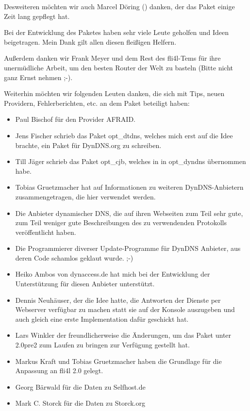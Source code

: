 Desweiteren möchten wir auch Marcel Döring () danken,
der das Paket einige Zeit lang gepflegt hat.

Bei der Entwicklung des Paketes haben sehr viele Leute geholfen und
Ideen beigetragen. Mein Dank gilt allen diesen fleißigen Helfern.

Außerdem danken wir Frank Meyer und dem Rest des fli4l-Tems für ihre
unermüdliche Arbeit, um den besten Router der Welt zu
basteln (Bitte nicht ganz Ernst nehmen ;-).

Weiterhin möchten wir folgenden Leuten danken, die sich mit Tips, neuen
Providern, Fehlerberichten, etc. an dem Paket beteiligt haben:

\begin{itemize}
\item Paul Bischof für den Provider AFRAID.
\item Jens Fischer schrieb das Paket opt\_dtdns, welches mich erst auf die
	Idee brachte, ein Paket für DynDNS.org zu schreiben.
\item Till Jäger schrieb das Paket opt\_cjb, welches in in opt\_dyndns
	übernommen habe.
\item Tobias Gruetzmacher hat auf  Informationen zu
	weiteren DynDNS-Anbietern zusammengetragen, die hier verwendet werden.
\item Die Anbieter dynamischer DNS, die auf ihren Webseiten zum Teil sehr
	gute, zum Teil weniger gute Beschreibungen des zu verwendenden Protokolls
	veröffentlicht haben.
\item Die Programmierer diverser Update-Programme für DynDNS Anbieter, aus
	deren Code schamlos geklaut wurde. ;-)
\item Heiko Ambos von dynaccess.de hat mich bei der Entwicklung der
	Unterstützung für diesen Anbieter unterstützt.
\item Dennis Neuhäuser, der die Idee hatte, die Antworten der Dienste per
	Webserver verfügbar zu machen statt sie auf der Konsole auszugeben
	und auch gleich eine erste Implementation dafür geschickt hat.
\item Lars Winkler der freundlicherweise die Änderungen, um das Paket unter
	2.0pre2 zum Laufen zu bringen zur Verfügung gestellt hat.
\item Markus Kraft und Tobias Gruetzmacher haben die Grundlage für die
	Anpassung an fli4l 2.0 gelegt.
\item Georg Bärwald für die Daten zu Selfhost.de
\item Mark C. Storck für die Daten zu Storck.org

\end{itemize}
